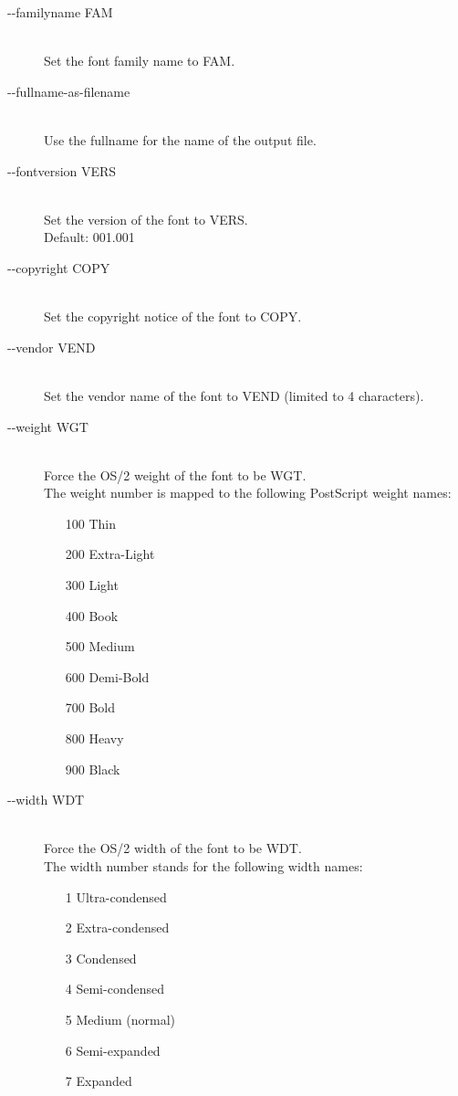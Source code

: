 \documentclass{scrartcl}
\begin{document}
\begin{description}
	\item[-{}-familyname FAM] \hfill \\
		Set the font family name to FAM.
	\item[-{}-fullname-as-filename] \hfill \\
		Use the fullname for the name of the output file.
	\item[-{}-fontversion VERS] \hfill \\
		Set the version of the font to VERS.\\
		Default: 001.001
	\item[-{}-copyright COPY] \hfill \\
		Set the copyright notice of the font to COPY.
	\item[-{}-vendor VEND] \hfill \\
		Set the vendor name of the font to VEND (limited to 4 characters).
	\item[-{}-weight WGT] \hfill \\
		 Force the OS/2 weight of the font to be WGT.\\
		 The weight number is mapped to the following PostScript weight names:
		 \begin{itemize}
		 	\item[100] Thin
		 	\item[200] Extra-Light
		 	\item[300] Light
		 	\item[400] Book
		 	\item[500] Medium 
		 	\item[600] Demi-Bold
		 	\item[700] Bold
		 	\item[800] Heavy
		 	\item[900] Black
		 \end{itemize}
	\item[-{}-width WDT] \hfill \\
		Force the OS/2 width of the font to be WDT.\\
		 The width number stands for the following width names:
		 \begin{itemize}
		 	\item[1] Ultra-condensed
		 	\item[2] Extra-condensed
		 	\item[3] Condensed
		 	\item[4] Semi-condensed
		 	\item[5] Medium (normal)
		 	\item[6] Semi-expanded
		 	\item[7] Expanded

\end{itemize}
\end{description}
\end{document}
